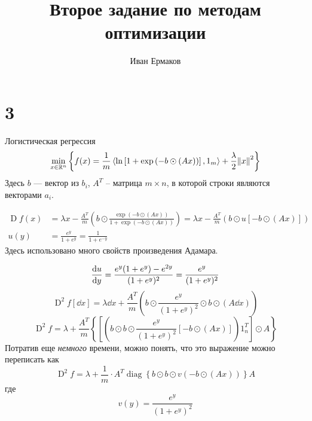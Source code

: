 \documentclass[notitlepage]{article}
\title{Второе задание по методам оптимизации}
\author{Иван Ермаков}
\date{}
\newcommand\inner[2]{\left\langle #1, #2 \right\rangle}
\begin{document}
\maketitle
\section*{3}
Логистическая регрессия
\begin{equation}
  \min_{x \in \mathbb{R}^n} \left\{f(x) = \frac 1m\inner{\ln\left[1 + \exp\left(-b \odot \left(A x\right)\right)\right]}{1_m}
  + \frac{\lambda}2 \norm{x}^2\right\}
\end{equation}
Здесь $b$ --- вектор из $b_i$, $A^T$ -- матрица $m \times n$, в которой строки являются векторами $a_i$.

\begin{equation}
  \begin{aligned}
    \operatorname{D} f(x) &= \lambda x - \frac {A^T} m\left(b\odot\frac{\exp\left(-b \odot \left(A x\right)\right)}
  {1 + \exp\left(-b \odot \left(A x\right)\right)}\right) = 
  \lambda x - \frac {A^T} m\left(b\odot u\left[-b\odot \left(A x\right)\right]\right)\\
  u(y) &= \frac{e^y}{1 + e^y} = \frac1{1 + e^{-y}}
  \end{aligned}
\end{equation}
Здесь использовано много свойств произведения Адамара.

\begin{equation}
    \dv{u}{y} = \frac{e^y(1 + e^y) - e^{2y}}{(1 + e^y)^2} = \frac{e^y}{(1 + e^y)^2}\\
    \end{equation}
\begin{equation}
  \operatorname{D}^2 f[\dd x] = \lambda \dd x + \frac {A^T}m \left(b\odot \frac{e^y}{(1 + e^y)^2} \odot b \odot \left(A \dd x \right)\right)
    \end{equation}
\begin{equation}
  \operatorname{D}^2 f = 
  \lambda + \frac {A^T}m \left\{\left[\left(b \odot b \odot \frac{e^y}{(1 + e^y)^2}[-b \odot (Ax)]\right) 1_n^T\right] \odot A\right\}
\end{equation}
Потратив еще \textit{немного} времени, можно понять, что это выражение можно переписать как
\begin{equation}
  \operatorname{D}^2 f = \lambda + \frac 1m \cdot A^T \operatorname{diag}\left\{b\odot b \odot v(-b \odot \left(A x\right))\right\} A
\end{equation}
где
\begin{equation}
  v(y) = \frac{e^y}{(1 + e^y)^2}
\end{equation}
\end{document}
